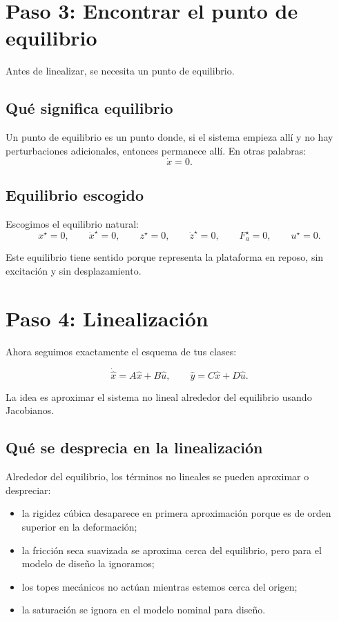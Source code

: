 \documentclass[11pt]{article}
\begin{document}
\section{Paso 3: Encontrar el punto de equilibrio}

Antes de linealizar, se necesita un punto de equilibrio.

\subsection{Qu\'e significa equilibrio}

Un punto de equilibrio es un punto donde, si el sistema empieza all\'i y no hay perturbaciones adicionales, entonces permanece all\'i. En otras palabras:
\[
\dot{x}=0.
\]

\subsection{Equilibrio escogido}

Escogimos el equilibrio natural:
\[
x^\star = 0,\qquad
\dot{x}^\star = 0,\qquad
z^\star = 0,\qquad
\dot{z}^\star = 0,\qquad
F_a^\star = 0,\qquad
u^\star = 0.
\]

Este equilibrio tiene sentido porque representa la plataforma en reposo, sin excitaci\'on y sin desplazamiento.

\section{Paso 4: Linealizaci\'on}

Ahora seguimos exactamente el esquema de tus clases:

\begin{equation}
\dot{\hat{x}} = A\hat{x} + B\hat{u}, \qquad \hat{y}=C\hat{x}+D\hat{u}.
\end{equation}

La idea es aproximar el sistema no lineal alrededor del equilibrio usando Jacobianos.

\subsection{Qu\'e se desprecia en la linealizaci\'on}

Alrededor del equilibrio, los t\'erminos no lineales se pueden aproximar o despreciar:

\begin{itemize}[leftmargin=1.2cm]
\item la rigidez c\'ubica desaparece en primera aproximaci\'on porque es de orden superior en la deformaci\'on;
\item la fricci\'on seca suavizada se aproxima cerca del equilibrio, pero para el modelo de dise\~no la ignoramos;
\item los topes mec\'anicos no act\'uan mientras estemos cerca del origen;
\item la saturaci\'on se ignora en el modelo nominal para dise\~no.
\end{itemize}
\end{document}
